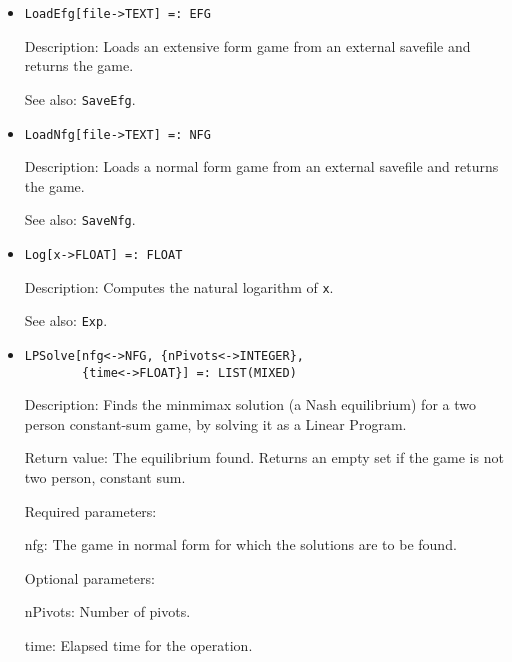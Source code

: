 \begin{itemize}
\item
\protect \large \begin{verbatim}
LoadEfg[file->TEXT] =: EFG
\end{verbatim}\normalsize

\bd
\item
[Description:] Loads an extensive form game from an external savefile
and returns the game.
\item
[See also:] {\tt SaveEfg}.
\ed

\item
\protect \large \begin{verbatim}
LoadNfg[file->TEXT] =: NFG
\end{verbatim}\normalsize

\bd
\item
[Description:] Loads a normal form game from an external savefile
and returns the game.  
\item
[See also:] {\tt SaveNfg}.
\ed

\item
\protect \large \begin{verbatim}
Log[x->FLOAT] =: FLOAT
\end{verbatim} \normalsize

\bd
\item
[Description:] Computes the natural logarithm of \verb+x+.
\item
[See also:] {\tt Exp}.
\ed

\item
\protect \large \begin{verbatim}
LPSolve[nfg<->NFG, {nPivots<->INTEGER},
        {time<->FLOAT}] =: LIST(MIXED)
\end{verbatim}\normalsize

\bd
\item
[Description:] Finds the minmimax solution (a Nash equilibrium) for a
two person constant-sum game, by solving it as a Linear Program.
\item
[Return value:] The equilibrium found.  Returns an empty set if the
game is not two person, constant sum. 
\item
[Required parameters:]
\bd
\item
[nfg:] The game in normal form for which the solutions are to be found.  
\ed

\item
[Optional parameters:]\hfil\null

\bd
\item[nPivots:] Number of pivots. 
\item[time:] Elapsed time for the operation.
\ed
\ed


\end{itemize}
